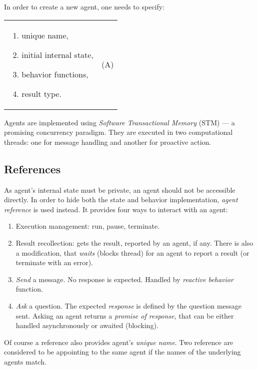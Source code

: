 \documentclass[../ThesisDoc]{subfiles}
\begin{document}
\medskip

\noindent
In order to create a new agent, one needs to specify: \\
\begin{tabularx}{\textwidth}{X c}
  \multicolumn{1}{m{0.4\textwidth}}{
    \begin{enumerate}
      \item unique name,
      \item initial internal state,
      \item behavior functions,
      \item result type.
    \end{enumerate}
  }
&  (A)
\end{tabularx}

\bigskip

\noindent
Agents are implemented using \emph{Software Transactional Memory} (STM)
\cite{STMCode07} --- a promising concurrency paradigm.
They are executed in two computational threads:
one for message handling and another for proactive action.

\subsection{References}
As agent's internal state must be private, an agent should not be accessible directly.
In order to hide both the state and behavior implementation, \emph{agent reference}
is used instead. It provides four ways to interact with an agent:
\begin{enumerate}
  \item Execution management: run, pause, terminate.
  \item Result recollection: gets the result, reported by an agent, if any.
        There is also a modification, that \emph{waits} (blocks thread) for an agent
        to report a result (or terminate with an error).
  \item \emph{Send} a message. No response is expected. Handled by
        \emph{reactive behavior} function.
  \item \emph{Ask} a question. The expected \emph{response} is defined by
        the question message sent. Asking an agent returns a \emph{promise of response},
        that can be either handled asynchronously or awaited (blocking).
\end{enumerate}

Of course a reference also provides agent's \emph{unique name}. Two
reference are considered to be appointing to the same agent if the names
of the underlying agents match.
\end{document}
